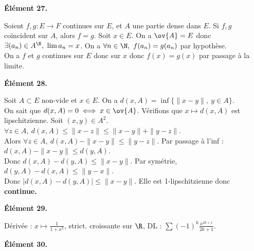 \documentclass[11pt]{article}
\begin{document}
\bf{Élément 27.}

\begin{prop}{}{}
    Soient $f,g:E\to F$ continues sur $E$, et $A$ une partie dense dans $E$. Si $f,g$ coïncident sur $A$, alors $f=g$.
    \tcblower
    Soit $x\in E$. On a $\ov{A}=E$ donc $\exists (a_n) \in A^\N, ~ \lim a_n = x$. On a $\forall n \in \N, ~ f(a_n)=g(a_n)$ par hypothèse.\\
    On a $f$ et $g$ continues sur $E$ donc sur $x$ donc $f(x)=g(x)$ par passage à la limite.
\end{prop}

\bf{Élément 28.}

\begin{ex}{}{}
    Soit $A\subset E$ non-vide et $x\in E$. On a $d(x,A)=\inf\{\|x-y\|, ~ y \in A\}$.\\
    On sait que $d(x,A)=0 \iff x \in \ov{A}$. Vérifions que $x\mapsto d(x,A)$ est lipschitzienne.
    \tcblower
    Soit $(x,y)\in A^2$. $\forall z \in A, ~ d(x,A) \leq \|x-z\| \leq \|x-y\| + \|y-z\|$.\\
    Alors $\forall z \in A, ~ d(x,A) - \|x-y\| \leq \|y-z\|$. Par passage à l'inf : $d(x,A)-\|x-y\|\leq d(y,A)$.\\
    Donc $d(x,A) - d(y,A) \leq \|x-y\|$. Par symétrie, $d(y,A)-d(x,A)\leq\|y-x\|$.\\
    Donc $|d(x,A)-d(y,A)|\leq\|x-y\|$. Elle est 1-lipschitzienne donc \bf{continue}.
\end{ex}

\bf{Élément 29.}

\begin{rappel}{}{}
    Dérivée : $x\mapsto\frac{1}{1+x^2}$, strict. croissante sur $\R$, DL : $\sum(-1)^{k}\frac{x^{2k+1}}{2k+1}$.
\end{rappel}

\pagebreak

\bf{Élément 30.}
\end{document}
